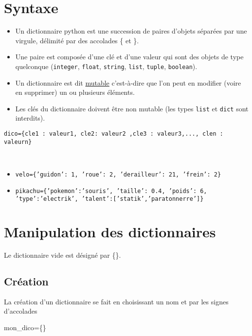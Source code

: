 \section{Syntaxe}

\begin{itemize}
\item Un dictionnaire python est une succession de paires d'objets séparées par une virgule, délimité par des accolades \{ et \}.
\item Une paire est composée d'une clé et d'une valeur qui sont des objets de type quelconque (\texttt{integer}, \texttt{float}, \texttt{string}, \texttt{list}, \texttt{tuple}, \texttt{boolean}).
\item Un dictionnaire est dit \underline{mutable} c'est-à-dire que l'on peut en modifier (voire en supprimer) un ou plusieurs éléments.
\item Les clés du dictionnaire doivent être non mutable (les types \texttt{list} et \texttt{dict} sont interdits).
\end{itemize}

\begin{center}
\texttt{dico=\{cle1 : valeur1, cle2: valeur2  ,cle3 : valeur3,..., clen : valeurn\}\\}
\end{center}

\begin{exemple}~\\

\begin{itemize}
\item \texttt{velo=\{'guidon': 1, 'roue': 2, 'derailleur': 21, 'frein': 2\}}
\item \texttt{pikachu=\{'pokemon':'souris', 'taille': 0.4, 'poids': 6, 'type':'electrik', 'talent':['statik','paratonnerre']\}}
\end{itemize}
\end{exemple}

\section{Manipulation des dictionnaires}
Le dictionnaire vide est désigné par \{\}.
\subsection*{Création}
La création d'un dictionnaire se fait en choisissant un nom et par les signes d'accolades
\begin{python}
mon\_dico=\{\}
\end{python}


